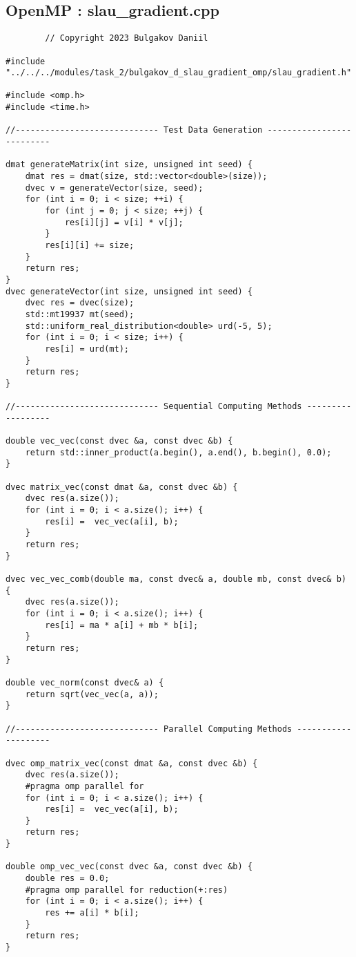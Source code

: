 \documentclass[14pt, russian]{extarticle}
\begin{document}
        \subsection{OpenMP : slau\_gradient.cpp}
        \begin{lstlisting}
        // Copyright 2023 Bulgakov Daniil

#include "../../../modules/task_2/bulgakov_d_slau_gradient_omp/slau_gradient.h"

#include <omp.h>
#include <time.h>

//----------------------------- Test Data Generation --------------------------

dmat generateMatrix(int size, unsigned int seed) {
    dmat res = dmat(size, std::vector<double>(size));
    dvec v = generateVector(size, seed);
    for (int i = 0; i < size; ++i) {
        for (int j = 0; j < size; ++j) {
            res[i][j] = v[i] * v[j];
        }
        res[i][i] += size;
    }
    return res;
}
dvec generateVector(int size, unsigned int seed) {
    dvec res = dvec(size);
    std::mt19937 mt(seed);
    std::uniform_real_distribution<double> urd(-5, 5);
    for (int i = 0; i < size; i++) {
        res[i] = urd(mt);
    }
    return res;
}

//----------------------------- Sequential Computing Methods ------------------

double vec_vec(const dvec &a, const dvec &b) {
    return std::inner_product(a.begin(), a.end(), b.begin(), 0.0);
}

dvec matrix_vec(const dmat &a, const dvec &b) {
    dvec res(a.size());
    for (int i = 0; i < a.size(); i++) {
        res[i] =  vec_vec(a[i], b);
    }
    return res;
}

dvec vec_vec_comb(double ma, const dvec& a, double mb, const dvec& b) {
    dvec res(a.size());
    for (int i = 0; i < a.size(); i++) {
        res[i] = ma * a[i] + mb * b[i];
    }
    return res;
}

double vec_norm(const dvec& a) {
    return sqrt(vec_vec(a, a));
}

//----------------------------- Parallel Computing Methods --------------------

dvec omp_matrix_vec(const dmat &a, const dvec &b) {
    dvec res(a.size());
    #pragma omp parallel for
    for (int i = 0; i < a.size(); i++) {
        res[i] =  vec_vec(a[i], b);
    }
    return res;
}

double omp_vec_vec(const dvec &a, const dvec &b) {
    double res = 0.0;
    #pragma omp parallel for reduction(+:res)
    for (int i = 0; i < a.size(); i++) {
        res += a[i] * b[i];
    }
    return res;
}


\end{lstlisting}
\end{document}
